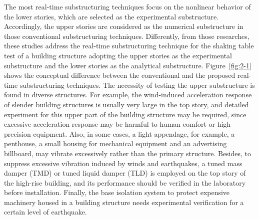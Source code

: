 The most real-time substructuring techniques focus on the nonlinear behavior of the lower stories, which are selected as the experimental substructure. Accordingly, the upper stories are considered as the numerical substructure in those conventional substructuring techniques. Differently, from those researches, these studies address the real-time substructuring technique for the shaking table test of a building structure adopting the upper stories as the experimental substructure and the lower stories as the analytical substructure. Figure~\ref{fig:2-1} shows the conceptual difference between the conventional and the proposed real-time substructuring techniques. 
The necessity of testing the upper substructure is found in diverse structures. For example, the wind-induced acceleration response of slender building structures is usually very large in the top story, and detailed experiment for this upper part of the building structure may be required, since excessive acceleration response may be harmful to human comfort or high precision equipment. Also, in some cases, a light appendage, for example, a penthouse, a small housing for mechanical equipment and an advertising billboard, may vibrate excessively rather than the primary structure. Besides, to suppress excessive vibration induced by winds and earthquakes, a tuned mass damper (TMD) or tuned liquid damper (TLD) is employed on the top story of the high-rise building, and its performance should be verified in the laboratory before installation. Finally, the base isolation system to protect expensive machinery housed in a building structure needs experimental verification for a certain level of earthquake.

